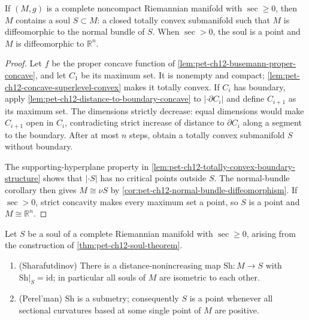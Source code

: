 \begin{theorem}
  \label{thm:pet-ch12-soul-theorem}
  If $(M,g)$ is a complete noncompact Riemannian manifold with $\sec\ge0$, then
  $M$ contains a soul $S\subset M$: a closed totally convex submanifold such
  that $M$ is diffeomorphic to the normal bundle of $S$. When $\sec>0$, the soul
  is a point and $M$ is diffeomorphic to $\mathbb{R}^n$.
\end{theorem}
\begin{proof}
  \sketch
  Let \(f\) be the proper concave function of
  \cref{lem:pet-ch12-busemann-proper-concave}, and let \(C_1\) be its maximum
  set. It is nonempty and compact; \cref{lem:pet-ch12-concave-superlevel-convex}
  makes it totally convex. If \(C_i\) has boundary, apply
  \cref{lem:pet-ch12-distance-to-boundary-concave} to
  \( |\cdot\partial C_i|\) and define
  \(C_{i+1}\) as its maximum set. The dimensions strictly decrease: equal
  dimensions would make \(C_{i+1}\) open in \(C_i\), contradicting strict
  increase of distance to \(\partial C_i\) along a segment to the boundary.
  After at most \(n\) steps, obtain a totally convex submanifold \(S\) without
  boundary.

  The supporting-hyperplane property in
  \cref{lem:pet-ch12-totally-convex-boundary-structure} shows that
  \( |\cdot S|\) has
  no critical points outside \(S\). The normal-bundle corollary then gives
  \(M\cong\nu S\) by \cref{cor:pet-ch12-normal-bundle-diffeomorphism}. If
  \(\sec>0\), strict concavity makes every maximum set
  a point, so \(S\) is a point and \(M\cong\mathbb{R}^n\).
\end{proof}

\begin{theorem}
  \label{thm:pet-ch12-soul-uniqueness-submetry}
  Let $S$ be a soul of a complete Riemannian manifold with $\sec\ge0$, arising
  from the construction of \cref{thm:pet-ch12-soul-theorem}.
  \begin{enumerate}
    \item (Sharafutdinov) There is a distance-nonincreasing map
      $\mathrm{Sh}:M\to S$ with $\mathrm{Sh}|_S=\mathrm{id}$; in particular all
      souls of $M$ are isometric to each other.
    \item (Perel'man) $\mathrm{Sh}$ is a submetry; consequently $S$ is a point
      whenever all sectional curvatures based at some single point of $M$ are
      positive.
  \end{enumerate}
\end{theorem}

